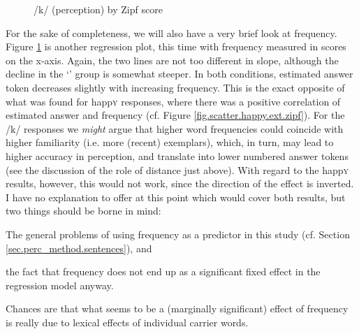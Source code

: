\begin{figure}[h]
	\centering
		\resizebox{.49\linewidth}{!}{} 
	\caption{/k/ (perception) by Zipf score}
	\label{fig.scatter.k.ext.zipf}
\end{figure}

For the sake of completeness, we will also have a very brief look at frequency.
Figure \ref{fig.scatter.k.ext.zipf} is another regression plot, this time with frequency measured in  scores on the x-axis.
Again, the two lines are not too different in slope, although the decline in the `' group is somewhat steeper.
In both  conditions, estimated answer token decreases slightly with increasing frequency.
This is the exact opposite of what was found for happ\textsc{y} responses, where there was a positive correlation of estimated answer and frequency (cf. Figure \ref{fig.scatter.happy.ext.zipf}).
For the /k/ responses we \emph{might} argue that higher word frequencies could coincide with higher familiarity (i.e. more (recent) exemplars), which, in turn, may lead to higher accuracy in perception, and translate into lower numbered answer tokens (see the discussion of the role of distance just above).
With regard to the happ\textsc{y} results, however, this would not work, since the direction of the effect is inverted.
I have no explanation to offer at this point which would cover both results, but two things should be borne in mind:
\begin{inparaenum}[(a)]
	\item The general problems of using frequency as a predictor in this study (cf. Section \ref{sec.perc_method.sentences}), and
	\item the fact that frequency does not end up as a significant fixed effect in the regression model anyway.
\end{inparaenum}
Chances are that what seems to be a (marginally significant) effect of frequency is really due to lexical effects of individual carrier words.